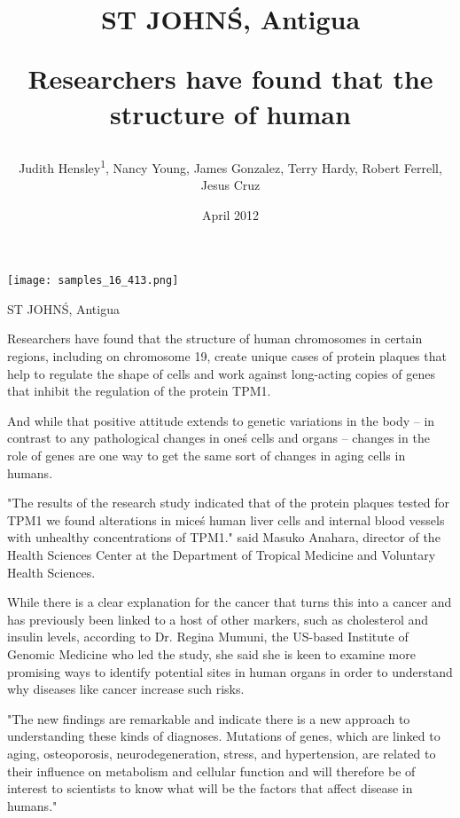 \documentclass{article}
\title{ST JOHN\'S, Antigua

Researchers have found that the structure of human}
\author{Judith Hensley\textsuperscript{1},  Nancy Young,  James Gonzalez,  Terry Hardy,  Robert Ferrell,  Jesus Cruz}
\affil{\textsuperscript{1}University of California, San Francisco}
\date{April 2012}
\begin{document}
\maketitle

\begin{center}
\begin{minipage}{0.75\linewidth}
\texttt{[image: samples\_16\_413.png]}
\end{minipage}
\end{center}

ST JOHN\'S, Antigua

Researchers have found that the structure of human chromosomes in certain regions, including on chromosome 19, create unique cases of protein plaques that help to regulate the shape of cells and work against long-acting copies of genes that inhibit the regulation of the protein TPM1.

And while that positive attitude extends to genetic variations in the body -- in contrast to any pathological changes in one\'s cells and organs -- changes in the role of genes are one way to get the same sort of changes in aging cells in humans.

"The results of the research study indicated that of the protein plaques tested for TPM1 we found alterations in mice\'s human liver cells and internal blood vessels with unhealthy concentrations of TPM1." said Masuko Anahara, director of the Health Sciences Center at the Department of Tropical Medicine and Voluntary Health Sciences.

While there is a clear explanation for the cancer that turns this into a cancer and has previously been linked to a host of other markers, such as cholesterol and insulin levels, according to Dr. Regina Mumuni, the US-based Institute of Genomic Medicine who led the study, she said she is keen to examine more promising ways to identify potential sites in human organs in order to understand why diseases like cancer increase such risks.

"The new findings are remarkable and indicate there is a new approach to understanding these kinds of diagnoses. Mutations of genes, which are linked to aging, osteoporosis, neurodegeneration, stress, and hypertension, are related to their influence on metabolism and cellular function and will therefore be of interest to scientists to know what will be the factors that affect disease in humans."
\end{document}
